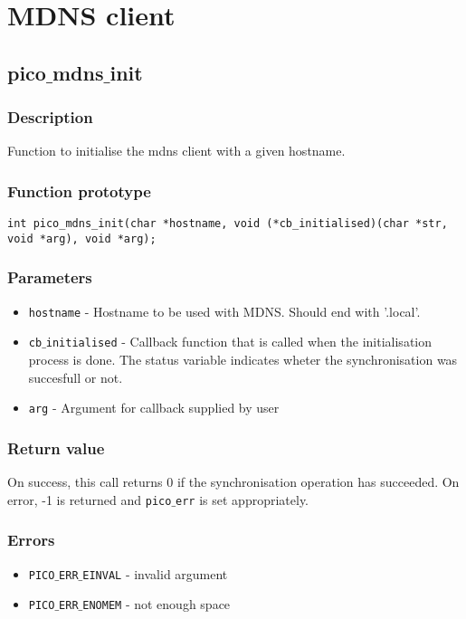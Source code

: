 \section{MDNS client}



\subsection{pico$\_$mdns$\_$init}

\subsubsection*{Description}
Function to initialise the mdns client with a given hostname.
\subsubsection*{Function prototype}
\begin{verbatim}
int pico_mdns_init(char *hostname, void (*cb_initialised)(char *str, void *arg), void *arg);
\end{verbatim}

\subsubsection*{Parameters}
\begin{itemize}[noitemsep]
\item \texttt{hostname} - Hostname to be used with MDNS. Should end with '.local'.
\item \texttt{cb$\_$initialised} - Callback function that is called when the initialisation process is done. The status variable indicates wheter the synchronisation was succesfull or not.
\item \texttt{arg} - Argument for callback supplied by user
\end{itemize}

\subsubsection*{Return value}
On success, this call returns 0 if the synchronisation operation has succeeded.
On error, -1 is returned and \texttt{pico$\_$err} is set appropriately.

\subsubsection*{Errors}
\begin{itemize}[noitemsep]
\item \texttt{PICO$\_$ERR$\_$EINVAL} - invalid argument
\item \texttt{PICO$\_$ERR$\_$ENOMEM} - not enough space
\end{itemize}

